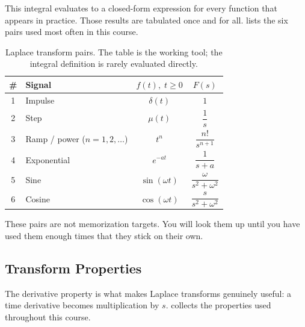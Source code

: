 \documentclass[../../book.tex]{subfiles}
\begin{document}
This integral evaluates to a closed-form expression for every function that
appears in practice.  Those results are tabulated once and for all.
 lists the six pairs used most often in this course.

\begin{table}[htbp]
\centering
\caption{Laplace transform pairs.  The table is the working tool; the integral
  definition is rarely evaluated directly.}
\label{tab:pairs}
\begin{tabular}{clcc}
\toprule
\# & Signal & $f(t),\; t \geq 0$ & $F(s)$ \\
\midrule
1 & Impulse     & $\delta(t)$       & $1$ \\[4pt]
2 & Step        & $\mu(t)$          & $\dfrac{1}{s}$ \\[8pt]
3 & Ramp / power ($n = 1, 2, \ldots$) & $t^n$ & $\dfrac{n!}{s^{n+1}}$ \\[8pt]
4 & Exponential & $e^{-at}$         & $\dfrac{1}{s+a}$ \\[8pt]
5 & Sine        & $\sin(\omega t)$  & $\dfrac{\omega}{s^2+\omega^2}$ \\[8pt]
6 & Cosine      & $\cos(\omega t)$  & $\dfrac{s}{s^2+\omega^2}$ \\[4pt]
\bottomrule
\end{tabular}
\end{table}

These pairs are not memorization targets.  You will look them up until you have
used them enough times that they stick on their own.

\subsection{Transform Properties}
\label{sec:theorems}

The derivative property is what makes Laplace transforms genuinely useful: a
time derivative becomes multiplication by $s$.   collects
the properties used throughout this course.
\end{document}
